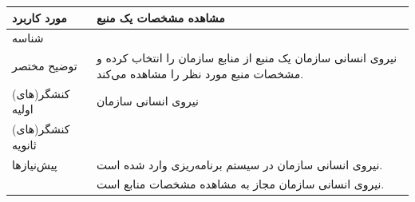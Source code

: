 \begin{table}[H]
	\centering
	\begin{tabular}{|p{3cm}|p{10cm}|}
		\hline
		
		مورد کاربرد	& مشاهده مشخصات یک منبع  \\
		\hline
		
		شناسه & 
		\stepcounter{usecase_ID}
		
		\arabic{usecase_ID} \\
		
		\hline
		
		توضیح مختصر & نیروی انسانی سازمان یک منبع از منابع سازمان را انتخاب کرده و مشخصات منبع مورد نظر را مشاهده می‌کند. \\
		\hline
		
		کنشگر(های) اولیه& نیروی انسانی سازمان  \\
		\hline
		
		کنشگر(های) ثانویه&  \\
		\hline
		
		پیش‌نیازها &
		نیروی انسانی سازمان در سیستم برنامه‌ریزی وارد شده است.\\
		& نیروی انسانی سازمان مجاز به مشاهده مشخصات منابع است. \\
		\hline
		

\end{tabular}
\end{table}
